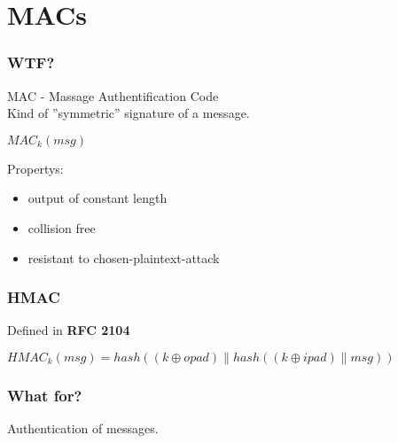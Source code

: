 \section{MACs}

\begin{frame}
	\frametitle{WTF?}
	MAC - Massage Authentification Code\\
	Kind of ''symmetric'' signature of a message.
	
	\begin{center}$MAC_k(msg)$\end{center}
	
	Propertys:
	\begin{itemize}
		\item output of constant length
		\item collision free
		\item resistant to chosen-plaintext-attack
	\end{itemize}
\end{frame}

\begin{frame}
	\frametitle{HMAC}
	Defined in \textbf{RFC 2104}
	\par
	$HMAC_k(msg) = hash((k \oplus opad) \parallel hash((k \oplus ipad)\parallel msg) )$
\end{frame}

\begin{frame}
	\frametitle{What for?}
	Authentication of messages.
\end{frame}